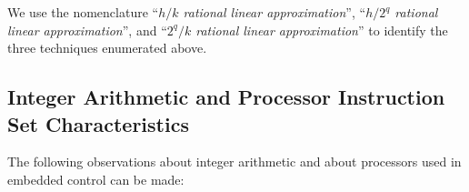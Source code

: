 We use the nomenclature ``\emph{$h/k$ rational linear approximation}'',
``\emph{$h/2^q$ rational linear approximation}'', and 
``\emph{$2^q/k$ rational linear approximation}'' to identify the three
techniques enumerated above.


\subsection{Integer Arithmetic and Processor Instruction Set Characteristics}
\label{crat0:shqq0:pis0}

The following observations about integer arithmetic and about processors 
used in embedded control can be made:

